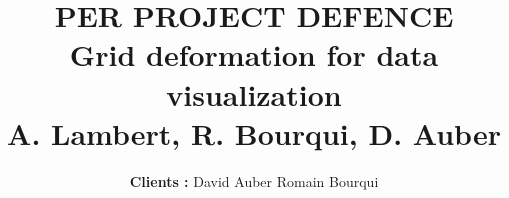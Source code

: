 
\def\presentation{PER PROJECT DEFENCE}
\def\bottomTitle{PER PROJECT}
\def\noteAboutAuthor{Engeneering students/ENSEIRB-MATMECA}
\def\subject{Grid deformation for data visualization}
\title[\bottomTitle]{
        {\bfseries \huge \presentation\\} 
        {\bfseries \subject}\\
        {\small\bf A. Lambert, R. Bourqui, D. Auber}\\   
}


\author[\noteAboutAuthor]{
  {\normalsize \bfseries \sffamily Clients : }
  David {\sc Auber} \hspace{1cm} Romain {\sc Bourqui}\\    
}

